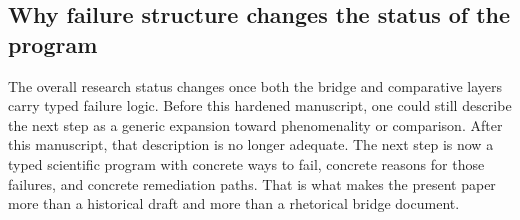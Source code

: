 \documentclass[11pt,a4paper]{article}
\theoremstyle{definition}
\begin{document}
\subsection{Why failure structure changes the status of the program}
The overall research status changes once both the bridge and comparative layers carry typed failure logic. Before this hardened manuscript, one could still describe the next step as a generic expansion toward phenomenality or comparison. After this manuscript, that description is no longer adequate. The next step is now a typed scientific program with concrete ways to fail, concrete reasons for those failures, and concrete remediation paths. That is what makes the present paper more than a historical draft and more than a rhetorical bridge document.

\printbibliography
\end{document}
